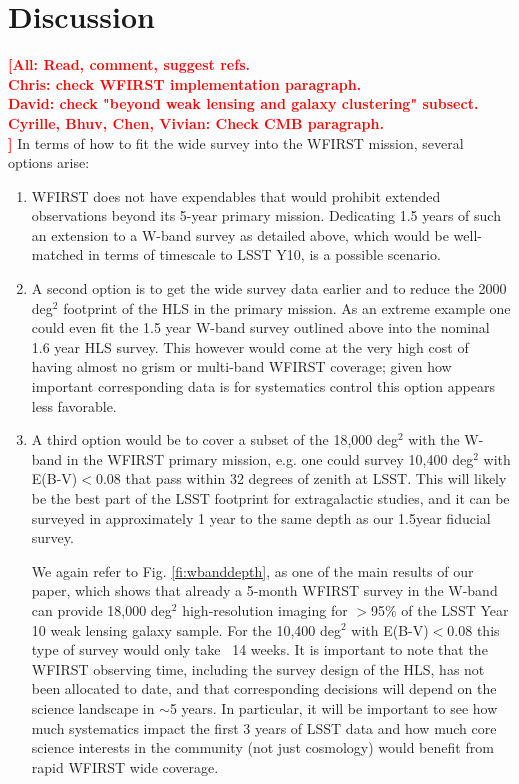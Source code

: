 \documentclass[fleqn,usenatbib,useAMS]{mnras}
\newcommand{\todo}[1]{\textcolor{red}{\textbf{[#1]}}}
\begin{document}
\section{Discussion}
\label{sec:discussion}
\todo{All: Read, comment, suggest refs. \\ Chris: check WFIRST implementation paragraph.\\ David: check "beyond weak lensing and galaxy clustering" subsect. \\ Cyrille, Bhuv, Chen, Vivian: Check CMB paragraph.\\ }
In terms of how to fit the wide survey into the WFIRST mission, several options arise: 
\begin{enumerate}
\item WFIRST does not have expendables that would prohibit extended observations beyond its 5-year primary mission. Dedicating 1.5 years of such an extension to a W-band survey as detailed above, which would be well-matched in terms of timescale to LSST Y10, is a possible scenario. 
\item A second option is to get the wide survey data earlier and to reduce the 2000 deg$^2$ footprint of the HLS in the primary mission. As an extreme example one could even fit the 1.5 year W-band survey outlined above into the nominal 1.6 year HLS survey. This however would come at the very high cost of having almost no grism or multi-band WFIRST coverage; given how important corresponding data is for systematics control this option appears less favorable.
\item A third option would be to cover a subset of the 18,000 deg$^2$ with the W-band in the WFIRST primary mission, e.g. one could survey 10,400 deg$^2$ with E(B-V)$<$0.08 that pass within 32 degrees of zenith at LSST. This will likely be the best part of the LSST footprint for extragalactic studies, and it can be surveyed in approximately 1 year to the same depth as our 1.5year fiducial survey. 

We again refer to Fig. \ref{fi:wbanddepth}, as one of the main results of our paper, which shows that already a 5-month WFIRST survey in the W-band can provide 18,000 deg$^2$ high-resolution imaging for $>$95\% of the LSST Year 10 weak lensing galaxy sample. For the 10,400 deg$^2$ with E(B-V)$<$0.08 this type of survey would only take ~14 weeks. It is important to note that the WFIRST observing time, including the survey design of the HLS, has not been allocated to date, and that corresponding decisions will depend on the science landscape in $\sim$5 years. In particular, it will be important to see how much systematics impact the first 3 years of LSST data and how much core science interests in the community (not just cosmology) would benefit from rapid WFIRST wide coverage.   
\end{enumerate}
\end{document}
